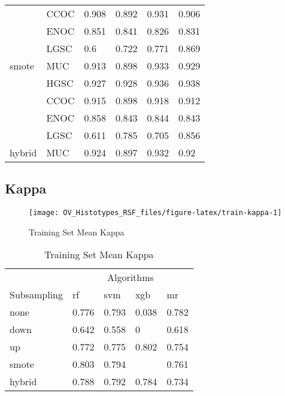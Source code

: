\documentclass[
]{report}
\begin{document}
\begin{table}
\begin{tabular}[t]{l|l|l|l|l|l}
\cline{2-6}
 & CCOC & 0.908 & 0.892 & 0.931 & 0.906\\
\cline{2-6}
 & ENOC & 0.851 & 0.841 & 0.826 & 0.831\\
\cline{2-6}
 & LGSC & 0.6 & 0.722 & 0.771 & 0.869\\
\cline{2-6}
\multirow{-5}{*}{\raggedright\arraybackslash smote} & MUC & 0.913 & 0.898 & 0.933 & 0.929\\
\cline{1-6}
 & HGSC & 0.927 & 0.928 & 0.936 & 0.938\\
\cline{2-6}
 & CCOC & 0.915 & 0.898 & 0.918 & 0.912\\
\cline{2-6}
 & ENOC & 0.858 & 0.843 & 0.844 & 0.843\\
\cline{2-6}
 & LGSC & 0.611 & 0.785 & 0.705 & 0.856\\
\cline{2-6}
\multirow{-5}{*}{\raggedright\arraybackslash hybrid} & MUC & 0.924 & 0.897 & 0.932 & 0.92\\
\hline
\end{tabular}
\end{table}

\subsection{Kappa}\label{kappa-1}

\begin{figure}[H]

{\centering \texttt{[image: OV\_Histotypes\_RSF\_files/figure-latex/train-kappa-1]} 

}

\caption{Training Set Mean Kappa}\label{fig:train-kappa}
\end{figure}

\begin{table}

\caption{\label{tab:train-kappa-table}Training Set Mean Kappa}
\centering
\begin{tabular}[t]{l|l|l|l|l}
\hline
\multicolumn{1}{c|}{ } & \multicolumn{4}{c}{Algorithms} \\
\cline{2-5}
Subsampling & rf & svm & xgb & mr\\
\hline
none & 0.776 & 0.793 & 0.038 & 0.782\\
\hline
down & 0.642 & 0.558 & 0 & 0.618\\
\hline
up & 0.772 & 0.775 & 0.802 & 0.754\\
\hline
smote & 0.803 & 0.794 & \cellcolor[HTML]{90ee90}{0.808} & 0.761\\
\hline
hybrid & 0.788 & 0.792 & 0.784 & 0.734\\
\hline
\end{tabular}
\end{table}
\end{document}
